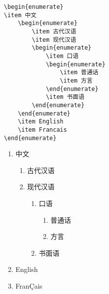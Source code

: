 \begin{minipage}[t]{0.45\textwidth}
\begin{lstlisting}
\begin{enumerate}
\item 中文
    \begin{enumerate}
        \item 古代汉语
        \item 现代汉语
        \begin{enumerate}
            \item 口语
            \begin{enumerate}
                \item 普通话
                \item 方言
            \end{enumerate}
            \item 书面语
        \end{enumerate}
    \end{enumerate}
    \item English
    \item Francais
\end{enumerate}
\end{lstlisting}
\end{minipage}
\hfill
\begin{minipage}[t]{0.45\textwidth}
    \begin{enumerate}
        \item 中文
        \begin{enumerate}
            \item 古代汉语
            \item 现代汉语
            \begin{enumerate}
                \item 口语
                \begin{enumerate}
                    \item 普通话
                    \item 方言
                \end{enumerate}
                \item 书面语
            \end{enumerate}
        \end{enumerate}
        \item English
        \item FranÇais
    \end{enumerate}
\end{minipage}

